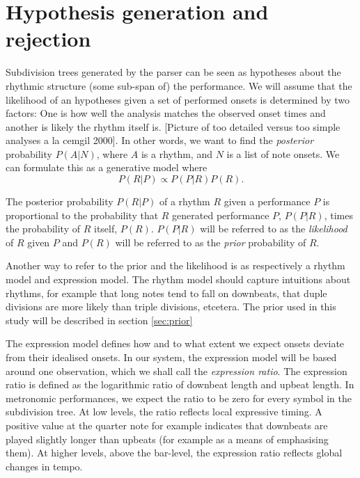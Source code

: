 \section{Hypothesis generation and rejection}
\label{sec:rejection}

Subdivision trees generated by the parser can be seen as hypotheses about the rhythmic structure (some sub-span of) the performance. We will assume that the likelihood of an hypotheses given a set of performed onsets is determined by two factors: One is how well the analysis matches the observed onset times and another is likely the rhythm itself is. [Picture of too detailed versus too simple analyses a la cemgil 2000]. In other words, we want to find the \textit{posterior} probability $P(A|N)$, where $A$ is a rhythm, and $N$ is a list of note onsets. We can formulate this as a generative model where
\begin{equation}
\label{eq:model}
P(R|P) \propto P(P|R)P(R).
\end{equation}

The posterior probability $P(R|P)$ of a rhythm $R$ given a performance $P$ is proportional to the probability that $R$ generated performance $P$, $P(P|R)$, times the probability of $R$ itself, $P(R)$. $P(P|R)$ will be referred to as the \textit{likelihood} of $R$ given $P$ and $P(R)$ will be referred to as the \textit{prior} probability of $R$.

Another way to refer to the prior and the likelihood is as respectively a rhythm model and expression model. The rhythm model should capture intuitions about rhythms, for example that long notes tend to fall on downbeats, that duple divisions are more likely than triple divisions, etcetera. The prior used in this study will be described in section \ref{sec:prior}

The expression model defines how and to what extent we expect onsets deviate from their idealised onsets. In our system, the expression model will be based around one observation, which we shall call the \textit{expression ratio}. The expression ratio is defined as the logarithmic ratio of downbeat length and upbeat length. In metronomic performances, we expect the ratio to be zero for every symbol in the subdivision tree. At low levels, the ratio reflects local expressive timing. A positive value at the quarter note for example indicates that downbeats are played slightly longer than upbeats (for example as a means of emphasising them). At higher levels, above the bar-level, the expression ratio reflects global changes in tempo.

